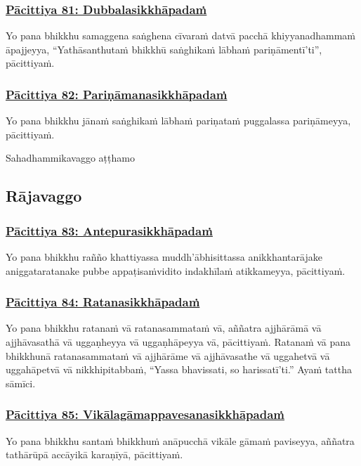 \subsubsection*{\hyperref[exp81]{Pācittiya 81: Dubbalasikkhāpadaṁ}}
\label{pac81}
Yo pana bhikkhu samaggena saṅghena cīvaraṁ datvā pacchā khiyyanadhammaṁ āpajjeyya, ``Yathāsanthutaṁ bhikkhū saṅghikaṁ lābhaṁ pariṇāmentī'ti'', pācittiyaṁ.

\subsubsection*{\hyperref[exp82]{Pācittiya 82: Pariṇāmanasikkhāpadaṁ}}
\label{pac82}
Yo pana bhikkhu jānaṁ saṅghikaṁ lābhaṁ pariṇataṁ puggalassa pariṇāmeyya, pācittiyaṁ.

\begin{center}
  Sahadhammikavaggo aṭṭhamo
\end{center}

\subsection{Rājavaggo}
\vspace{0.2cm}

\subsubsection*{\hyperref[exp83]{Pācittiya 83: Antepurasikkhāpadaṁ}}
\label{pac83}
Yo pana bhikkhu rañño khattiyassa muddh'ābhisittassa anikkhantarājake aniggataratanake pubbe appaṭisaṁvidito indakhīlaṁ atikkameyya, pācittiyaṁ.

\subsubsection*{\hyperref[exp84]{Pācittiya 84: Ratanasikkhāpadaṁ}}
\label{pac84}
Yo pana bhikkhu ratanaṁ vā ratanasammataṁ vā, aññatra ajjhārāmā vā ajjhāvasathā vā uggaṇheyya vā uggaṇhāpeyya vā, pācittiyaṁ. Ratanaṁ vā pana bhikkhunā ratanasammataṁ vā ajjhārāme vā ajjhāvasathe vā uggahetvā vā uggahāpetvā vā nikkhipitabbaṁ, ``Yassa bhavissati, so harissatī'ti.'' Ayaṁ tattha sāmīci.

\subsubsection*{\hyperref[exp85]{Pācittiya 85: Vikālagāmappavesanasikkhāpadaṁ}}
\label{pac85}
Yo pana bhikkhu santaṁ bhikkhuṁ anāpucchā vikāle gāmaṁ paviseyya, aññatra tathārūpā accāyikā karaṇīyā, pācittiyaṁ.

